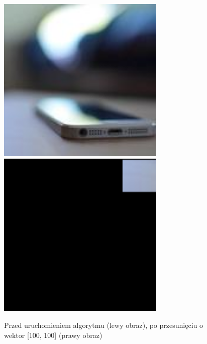 \documentclass[a4paper,12pt]{book}
\begin{document}
\begin{figure}[H]
	\caption{Przed uruchomieniem algorytmu (lewy obraz), po przesunięciu o wektor [100, 100] (prawy obraz)}
	\includegraphics[width=8cm, height=8cm]{phone-unmodified.jpg}
	\includegraphics[width=8cm, height=8cm]{4-1/translate-phone.png}
\end{figure}
\end{document}
